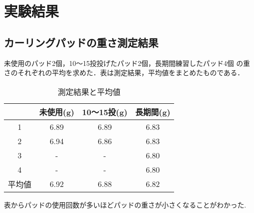 \documentclass[main]{subfiles}
\begin{document}
\chapter{実験結果}
\section{カーリングパッドの重さ測定結果}
未使用のパッド2個，10～15投投げたパッド2個，長期間練習したパッド4個
の重さのそれぞれの平均を求めた．表は測定結果，平均値をまとめたものである．
\\   

\begin{table}
    \centering
    \caption{測定結果と平均値}
    \label{table:tab}
  \begin{tabular}{c|c|c|c}

     & 未使用(g) & 10～15投(g) & 長期間(g)\\ \hline
    1 & 6.89 & 6.89 & 6.83\\ \hline
    2 & 6.94 & 6.86 & 6.83\\ \hline
    3 & - & - & 6.80 \\ \hline
    4 & - & - & 6.80 \\ \hline
    平均値& 6.92 & 6.88 & 6.82  \\
  \end{tabular}
\end{table}
表からパッドの使用回数が多いほどパッドの重さが小さくなることがわかった.
\end{document}
